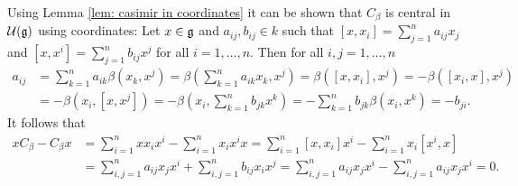 \begin{rem}
 Using Lemma \ref{lem: casimir in coordinates} it can be shown that $C_\beta$ is central in $\mathcal{U}(\mathfrak{g})$ using coordinates: Let $x \in \mathfrak{g}$ and $a_{ij}, b_{ij} \in k$ such that $[x,x_i] = \sum_{j=1}^n a_{ij} x_j$ and $[x,x^i] = \sum_{j=1}^n b_{ij} x^j$ for all $i = 1, \dotsc, n$. Then for all $i,j = 1, \dotsc, n$
 \begin{align*}
  a_{ij}
  &= \sum_{k=1}^n a_{ik} \beta(x_k, x^j)
  = \beta\left( \sum_{k=1}^n a_{ik} x_k, x^j \right)
  = \beta([x, x_i], x^j)
  = -\beta([x_i, x], x^j) \\
  &= -\beta(x_i, [x, x^j])
  = -\beta\left( x_i, \sum_{k=1}^n b_{jk} x^k \right)
  = -\sum_{k=1}^n b_{jk} \beta(x_i, x^k)
  = -b_{ji}.
 \end{align*}
 It follows that
 \begin{align*}
  x C_\beta - C_\beta x
  &= \sum_{i=1}^n x x_i x^i - \sum_{i=1}^n x_i x^i x
  = \sum_{i=1}^n [x, x_i] x^i - \sum_{i=1}^n x_i [x^i, x] \\
  &= \sum_{i,j=1}^n a_{ij} x_j x^i + \sum_{i,j=1}^n b_{ij} x_i x^j
  = \sum_{i,j=1}^n a_{ij} x_j x^i - \sum_{i,j=1}^n a_{ij} x_j x^i
  = 0.
 \end{align*}
\end{rem}















